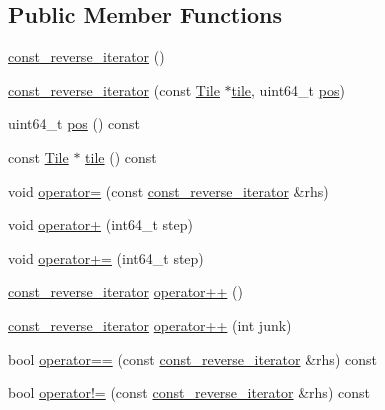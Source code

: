 \subsection*{Public Member Functions}
\begin{DoxyCompactItemize}
\item 
\hyperlink{classTile_1_1const__reverse__iterator_a55d04cc82fd772ff7a5fa836c8e40aaa}{const\+\_\+reverse\+\_\+iterator} ()
\item 
\hyperlink{classTile_1_1const__reverse__iterator_a6c18017e024e388b9a0fd76e9bca715b}{const\+\_\+reverse\+\_\+iterator} (const \hyperlink{classTile}{Tile} $\ast$\hyperlink{classTile_1_1const__reverse__iterator_ac30fa99b5b0d172a238701e54e5276bf}{tile}, uint64\+\_\+t \hyperlink{classTile_1_1const__reverse__iterator_ac88135a4eba24eb2f353026486ac44d3}{pos})
\item 
uint64\+\_\+t \hyperlink{classTile_1_1const__reverse__iterator_ac88135a4eba24eb2f353026486ac44d3}{pos} () const 
\item 
const \hyperlink{classTile}{Tile} $\ast$ \hyperlink{classTile_1_1const__reverse__iterator_ac30fa99b5b0d172a238701e54e5276bf}{tile} () const 
\item 
void \hyperlink{classTile_1_1const__reverse__iterator_a3a0a0d0c2eeafbac0814a5aa73d02116}{operator=} (const \hyperlink{classTile_1_1const__reverse__iterator}{const\+\_\+reverse\+\_\+iterator} \&rhs)
\item 
void \hyperlink{classTile_1_1const__reverse__iterator_ad11250bf125df1be52206ca9d8d4db40}{operator+} (int64\+\_\+t step)
\item 
void \hyperlink{classTile_1_1const__reverse__iterator_addc22aea56c8a7122671d3ad3588cf06}{operator+=} (int64\+\_\+t step)
\item 
\hyperlink{classTile_1_1const__reverse__iterator}{const\+\_\+reverse\+\_\+iterator} \hyperlink{classTile_1_1const__reverse__iterator_a0a19939fb1718c4d5fc094957fb9733f}{operator++} ()
\item 
\hyperlink{classTile_1_1const__reverse__iterator}{const\+\_\+reverse\+\_\+iterator} \hyperlink{classTile_1_1const__reverse__iterator_abcbf8c19c0a21ec0ac168d521d98f747}{operator++} (int junk)
\item 
bool \hyperlink{classTile_1_1const__reverse__iterator_a9331ea03877b735cb74ea9d189747cec}{operator==} (const \hyperlink{classTile_1_1const__reverse__iterator}{const\+\_\+reverse\+\_\+iterator} \&rhs) const 
\item 
bool \hyperlink{classTile_1_1const__reverse__iterator_a86754553e87a41edbb17d50cefcc09a3}{operator!=} (const \hyperlink{classTile_1_1const__reverse__iterator}{const\+\_\+reverse\+\_\+iterator} \&rhs) const 

\end{DoxyCompactItemize}

